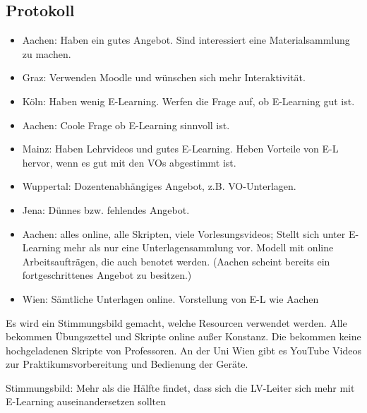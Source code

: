 \subsection*{Protokoll}
	\begin{itemize}
		\item Aachen: Haben ein gutes Angebot. Sind interessiert eine Materialsammlung zu machen.

		\item Graz: Verwenden Moodle und wünschen sich mehr Interaktivität.

		\item Köln: Haben wenig E-Learning. Werfen die Frage auf, ob E-Learning gut ist.

		\item Aachen: Coole Frage ob E-Learning sinnvoll ist.

		\item Mainz: Haben Lehrvideos und gutes E-Learning. Heben Vorteile von E-L hervor, wenn es gut mit den VOs abgestimmt ist.

		\item Wuppertal: Dozentenabhängiges Angebot, z.B. VO-Unterlagen.

		\item Jena: Dünnes bzw. fehlendes Angebot.

		\item Aachen: alles online, alle Skripten, viele Vorlesungsvideos;
		Stellt sich unter E-Learning mehr als nur eine Unterlagensammlung vor. Modell mit online Arbeitsaufträgen, die auch benotet werden. (Aachen scheint bereits ein fortgeschrittenes Angebot zu besitzen.)

		\item Wien: Sämtliche Unterlagen online. Vorstellung von E-L wie Aachen
	\end{itemize}

	Es wird ein Stimmungsbild gemacht, welche Resourcen verwendet werden. Alle bekommen Übungszettel und Skripte online außer Konstanz. Die bekommen keine hochgeladenen Skripte von Professoren. An der Uni Wien gibt es YouTube Videos zur Praktikumsvorbereitung und Bedienung der Ger\"ate.

	Stimmungsbild: Mehr als die Hälfte findet, dass sich die LV-Leiter sich mehr mit E-Learning auseinandersetzen sollten

